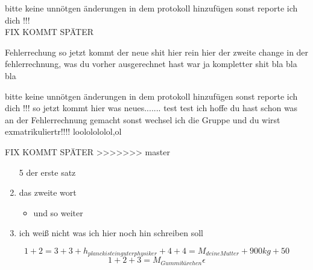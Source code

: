 \documentclass[a4paper]{scrartcl}
\begin{document}
		 \huge bitte keine unnötgen änderungen in dem protokoll hinzufügen sonst reporte ich dich !!!
		 \vspace{20pt}
		  \\ {\huge FIX KOMMT SPÄTER }
		  
		  
		 Fehlerrechung so jetzt kommt der neue shit hier rein
		 hier der zweite change in der fehlerrechnung, was du vorher ausgerechnet hast war ja kompletter shit
		 bla bla bla

		 \huge bitte keine unnötgen änderungen in dem protokoll hinzufügen sonst reporte ich dich !!!    so jetzt kommt hier was neues....... test test ich hoffe du hast schon was an der Fehlerrechnung gemacht sonst wechsel ich die Gruppe und du wirst exmatrikuliertr!!!! loololololol,ol
		 
		 
		 \vspace{20pt} {\huge FIX KOMMT SPÄTER }
>>>>>>> master
		
		
		
		
		\begin{enumerate}
			\item[5] der erste satz
			\item das zweite wort 
			\begin{itemize}
			\item und so weiter
			\end{itemize}
			\item ich weiß nicht was ich hier noch hin schreiben soll
		\end{enumerate}
	
	 $$1+2=3+3+h_{planck ist ein guter physiker}+4+4=M_{deine Mutter}+900 {kg}+50$$
	 \begin{equation}
	 1+2+3=M_{Gummibärchen}
	  \epsilon
	 \end{equation}
\end{document}
